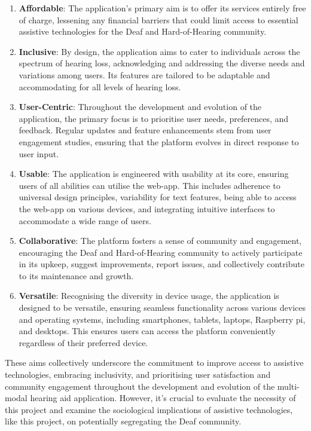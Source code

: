 \documentclass{l4proj}
\begin{document}
\begin{enumerate}[{PA}.1]
  \item \textbf{Affordable}: The application's primary aim is to offer its services entirely free of charge, lessening any financial barriers that could limit access to essential assistive technologies for the Deaf and Hard-of-Hearing community.
  \item \textbf{Inclusive}: By design, the application aims to cater to individuals across the spectrum of hearing loss, acknowledging and addressing the diverse needs and variations among users. Its features are tailored to be adaptable and accommodating for all levels of hearing loss.
  \item \textbf{User-Centric}: Throughout the development and evolution of the application, the primary focus is to prioritise user needs, preferences, and feedback. Regular updates and feature enhancements stem from user engagement studies, ensuring that the platform evolves in direct response to user input.
  \item \textbf{Usable}: The application is engineered with usability at its core, ensuring users of all abilities can utilise the web-app. This includes adherence to universal design principles, variability for text features, being able to access the web-app on various devices, and integrating intuitive interfaces to accommodate a wide range of users.
  \item \textbf{Collaborative}: The platform fosters a sense of community and engagement, encouraging the Deaf and Hard-of-Hearing community to actively participate in its upkeep, suggest improvements, report issues, and collectively contribute to its maintenance and growth.
  \item \textbf{Versatile}: Recognising the diversity in device usage, the application is designed to be versatile, ensuring seamless functionality across various devices and operating systems, including smartphones, tablets, laptops, Raspberry pi, and desktops. This ensures users can access the platform conveniently regardless of their preferred device.
\end{enumerate}

These aims collectively underscore the commitment to improve access to assistive technologies, embracing inclusivity, and prioritising user satisfaction and community engagement throughout the development and evolution of the multi-modal hearing aid application. However, it's crucial to evaluate the necessity of this project and examine the sociological implications of assistive technologies, like this project, on potentially segregating the Deaf community.
\end{document}

